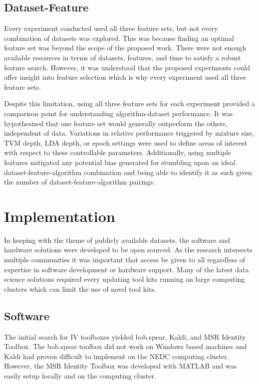 \subsection{Dataset-Feature}

Every experiment conducted used all three feature sets, but not every combination of datasets was explored. This was because finding an optimal feature set was beyond the scope of the proposed work. There were not enough available resources in terms of datasets, features, and time to satisfy a robust feature search. However, it was understood that the proposed experiments could offer insight into feature selection which is why every experiment used all three feature sets.

Despite this limitation, using all three feature sets for each experiment provided a comparison point for understanding algorithm-dataset performance. It was hypothesized that one feature set would generally outperform the others, independent of data. Variations in relative performance triggered by mixture size, \ac{TVM} depth, \ac{LDA} depth, or epoch settings were used to define areas of interest with respect to these controllable parameters. Additionally, using multiple features mitigated any potential bias generated for stumbling upon an ideal dataset-feature-algorithm combination and being able to identify it as such given the number of dataset-feature-algorithm pairings.

\section{Implementation}

In keeping with the theme of publicly available datasets, the software and hardware solutions were developed to be open sourced. As the research intersects multiple communities it was important that access be given to all regardless of expertise in software development or hardware support. Many of the latest data science solutions required every updating tool kits running on large computing clusters which can limit the use of novel tool kits.

\subsection{Software}

The initial search for \ac{IV} toolboxes yielded bob.spear\cite{Khoury2014a}, Kaldi\cite{Povey2011a}, and \ac{MSR} Identity Toolbox\cite{Sadjadi2013}. The bob.spear toolbox did not work on Windows based machines and Kaldi had proven difficult to implement on the \ac{NEDC} computing cluster. However, the \ac{MSR} Identity Toolbox was developed with MATLAB and was easily setup locally and on the computing cluster.

